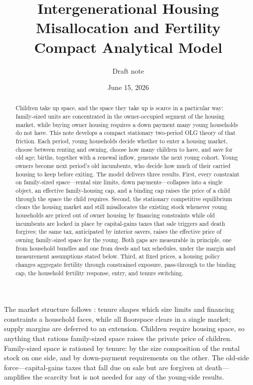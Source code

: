 \documentclass[11pt]{article}
\title{Intergenerational Housing Misallocation and Fertility\\[-0.15em]
\large Compact Analytical Model}
\author{Draft note}
\date{June 15, 2026}
\newcommand{\1}{\mathbf 1}
\begin{document}
\maketitle

\begin{abstract}
Children take up space, and the space they take up is scarce in a particular way: family-sized units are concentrated in the owner-occupied segment of the housing market, while buying owner housing requires a down payment many young households do not have. This note develops a compact stationary two-period OLG theory of that friction. Each period, young households decide whether to enter a housing market, choose between renting and owning, choose how many children to have, and save for old age; births, together with a renewal inflow, generate the next young cohort. Young owners become next period's old incumbents, who decide how much of their carried housing to keep before exiting. The model delivers three results. First, every constraint on family-sized space---rental size limits, down payments---collapses into a single object, an effective family-housing cap, and a binding cap raises the price of a child through the space the child requires. Second, the stationary competitive equilibrium clears the housing market and still misallocates the existing stock whenever young households are priced out of owner housing by financing constraints while old incumbents are locked in place by capital-gains taxes that sale triggers and death forgives; the same tax, anticipated by interior savers, raises the effective price of owning family-sized space for the young. Both gaps are measurable in principle, one from household bundles and one from deeds and tax schedules, under the margin and measurement assumptions stated below. Third, at fixed prices, a housing policy changes aggregate fertility through constrained exposure, pass-through to the binding cap, the household fertility response, entry, and tenure switching.
\end{abstract}

The market structure follows \citet{coven2024}: tenure shapes which size limits and financing constraints a household faces, while all floorspace clears in a single market; supply margins are deferred to an extension. Children require housing space, so anything that rations family-sized space raises the private price of children. Family-sized space is rationed by tenure: by the size composition of the rental stock on one side, and by down-payment requirements on the other. The old-side force---capital-gains taxes that fall due on sale but are forgiven at death---amplifies the scarcity but is not needed for any of the young-side results.
\end{document}
